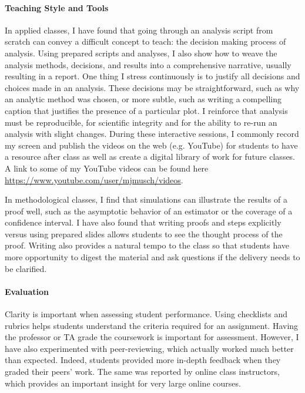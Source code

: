 \documentclass[12pt,a4paper]{article}
\begin{document}
\vspace{-1em}
\paragraph{Teaching Style and Tools} In applied classes, I have found that going through an analysis script from scratch can convey a difficult concept to teach: the decision making process of analysis.  Using prepared scripts and analyses, I also show how to weave the analysis methods, decisions, and results into a comprehensive narrative, usually resulting in a report.  One thing I stress continuously is to justify all decisions and choices made in an analysis.  These decisions may be straightforward, such as why an analytic method was chosen, or more subtle, such as writing a compelling caption that justifies the presence of a particular plot.  I reinforce that analysis must be reproducible, for scientific integrity and for the ability to re-run an analysis with slight changes. During these interactive sessions, I commonly record my screen and publish the videos on the web (e.g. YouTube) for students to have a resource after class as well as create a digital library of work for future classes.  A link to some of my YouTube videos can be found here \url{https://www.youtube.com/user/mjmusch/videos}.

In methodological classes, I find that simulations can illustrate the results of a proof well, such as the asymptotic behavior of an estimator or the coverage of a confidence interval.  I have also found that writing proofs and steps explicitly versus using prepared slides allows students to see the thought process of the proof.  Writing also provides a natural tempo to the class so that students have more opportunity to digest the material and ask questions if the delivery needs to be clarified.

\vspace{-1em}
\paragraph{Evaluation} Clarity is important when assessing student performance.  Using checklists and rubrics helps students understand the criteria required for an assignment.  Having the professor or TA grade the coursework is important for assessment.  However, I have also experimented with peer-reviewing, which actually worked much better than expected. Indeed, students provided more in-depth feedback when they graded their peers' work. The same was reported by online class instructors, which provides an important insight for very large online courses.
\end{document}
